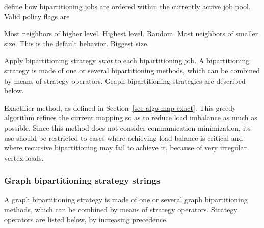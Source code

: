 \begin{itemize}
\begin{itemize}
define how bipartitioning jobs are ordered within the currently active job
pool. Valid policy flags are
\begin{itemize}
\iteme[{\tt L}]
Most neighbors of higher level.
\iteme[{\tt l}]
Highest level.
\iteme[{\tt r}]
Random.
\iteme[{\tt S}]
Most neighbors of smaller size. This is the default behavior.
\iteme[{\tt s}]
Biggest size.
\end{itemize}
\iteme[{\tt sep=}{\it strat}]
Apply bipartitioning strategy {\it strat\/} to each bipartitioning job.
A bipartitioning strategy is made of one or several bipartitioning methods,
which can be combined by means of strategy operators. Graph
bipartitioning strategies are described below.
\end{itemize}
\iteme[{\tt x}]
Exactifier method, as defined in Section~\ref{sec-algo-map-exact}.
This greedy algorithm refines the current mapping so as to reduce load
imbalance as much as possible. Since this method does not consider
communication minimization, its use should be restricted to cases
where achieving load balance is critical and where recursive
bipartitioning may fail to achieve it, because of very irregular
vertex loads.
\end{itemize}

\subsubsection{Graph bipartitioning strategy strings}
\label{sec-lib-format-bipart}

A graph bipartitioning strategy is made of one or several graph
bipartitioning methods, which can be combined by means of strategy
operators. Strategy operators are listed below, by increasing
precedence.

